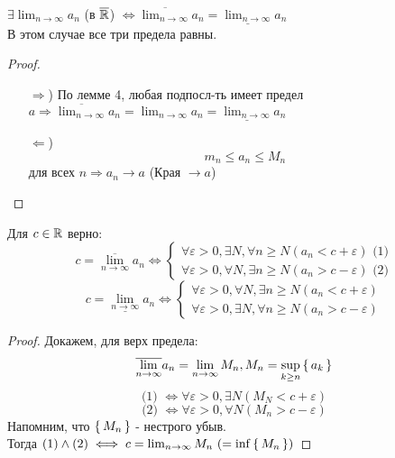 \begin{consequence}
$\exists \lim_{n\to\infty}a_n$ (в $\overline{\mathbb{R}}$) $\iff \overline{\lim_{n\to\infty}}a_n = \underline{\lim_{n\to\infty}} a_n$ \\
В этом случае все три предела равны.
\end{consequence}
\begin{proof}
  \begin{itemize}
    \item [$\Rightarrow$)]
По лемме 4, любая подпосл-ть имеет предел $a \Rightarrow \overline{\lim_{n\to\infty}}a_n = \lim_{n\to\infty}a_n = \underline{\lim_{n\to\infty}}a_n$ 
    \item [$\Leftarrow$)] \[
    m_n \leq a_n \leq M_n
    \]
    для всех $n \Rightarrow a_n \rightarrow a$ (Края $\rightarrow a$)
  \end{itemize}
\end{proof}
\begin{lemma}
Для $c \in \mathbb{R}$ верно:
\begin{equation*}
c = \overline{\lim_{n\to\infty}}a_n \iff 
\begin{cases}
\forall \varepsilon > 0, \exists N, \forall n \geq N (a_n < c + \varepsilon) \text{ (1)}\\
\forall \varepsilon > 0, \forall N, \exists n \geq N (a_n > c-\varepsilon) \text{ (2)}
\end{cases}
\end{equation*}
\begin{equation*}
c = \underline{\lim_{n\to\infty}}a_n \iff
\begin{cases}
\forall \varepsilon > 0, \forall N, \exists n \geq N (a_n < c + \varepsilon) \\
\forall \varepsilon > 0, \exists N, \forall n \geq N (a_n > c - \varepsilon)
\end{cases}
\end{equation*}
\end{lemma}
\begin{proof}
Докажем, для верх предела:
\[
  \overline{\lim_{n\to\infty}}a_n = \lim_{n\to\infty} M_n, M_n = \underset{k \geq n}{\sup} \set{a_k}
\]
\[
\text{(1) } \iff \forall \varepsilon > 0, \exists N (M_N < c + \varepsilon)
\]
\[
\text{(2) } \iff \forall \varepsilon > 0, \forall N (M_n > c - \varepsilon)
\]
Напомним, что $\set{M_n}$ - нестрого убыв. \\

Тогда $(1) \land (2) \iff c = \lim_{n\to\infty} M_n \text{ ($ = \inf \set{M_n}$)}$
\end{proof}
